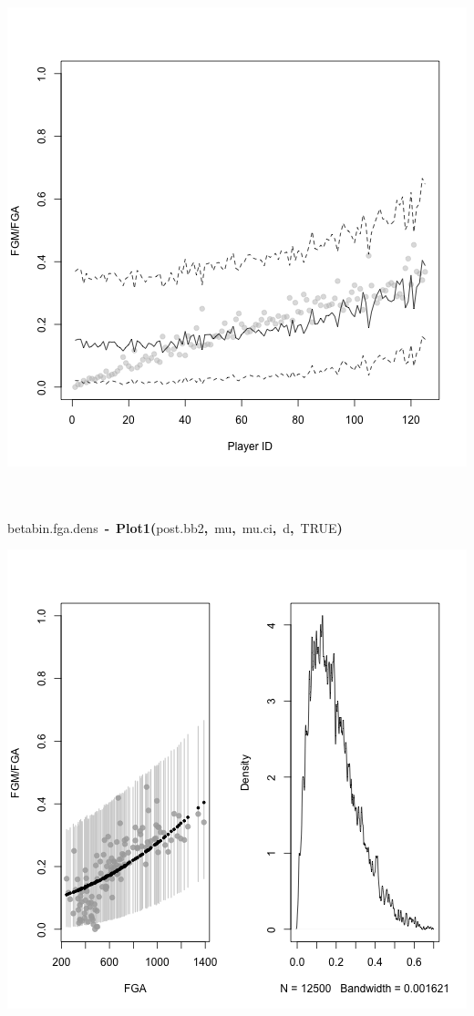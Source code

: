 \documentclass{article}
\makeatletter
\newcommand{\hlnumber}[1]{\textcolor[rgb]{0,0,0}{#1}}%
\newcommand{\hlfunctioncall}[1]{\textcolor[rgb]{.5,0,.33}{\textbf{#1}}}%
\newcommand{\hlkeyword}[1]{\textbf{#1}}%
\newcommand{\hlassignement}[1]{\textbf{#1}}%
\newcommand{\hlsymbol}[1]{#1}%
\newcommand{\hlstd}[1]{\textcolor[rgb]{0,0,0}{#1}}%
\newenvironment{kframe}{%
 \def\FrameCommand##1{\hskip\@totalleftmargin \hskip-\fboxsep
 \colorbox{shadecolor}{##1}\hskip-\fboxsep
     \hskip-\linewidth \hskip-\@totalleftmargin \hskip\columnwidth}%
 \MakeFramed {\advance\hsize-\width
   \@totalleftmargin\z@ \linewidth\hsize
   \@setminipage}}%
 {\par\unskip\endMakeFramed}
\newenvironment{knitrout}{}{} %
\makeatother
\begin{document}
\begin{knitrout}
{\begin{kframe}
\begin{flushleft}
\normalfont
\end{flushleft}
\includegraphics{post-bs-w-pred3} \begin{flushleft}
\ttfamily\noindent
\hspace*{\fill}\\
\hlstd{}\hspace*{\fill}\\
\hlstd{}\hlsymbol{betabin.fga.dens}{\ }\hlassignement{\usebox{\hlnormalsizeboxlessthan}-}{\ }\hlfunctioncall{Plot1}\hlkeyword{(}\hlsymbol{post.bb2}\hlkeyword{,}{\ }\hlsymbol{mu}\hlkeyword{,}{\ }\hlsymbol{mu.ci}\hlkeyword{,}{\ }\hlsymbol{d}\hlkeyword{,}{\ }\hlnumber{TRUE}\hlkeyword{)}\mbox{}
\normalfont
\end{flushleft}
\includegraphics{post-bs-w-pred4} \begin{flushleft}

\end{flushleft}
\end{kframe}}
\end{knitrout}
\end{document}
